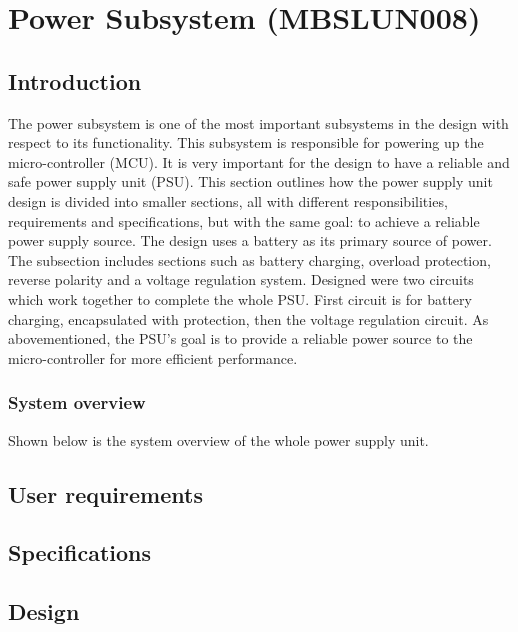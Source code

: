 \documentclass[class=report,11pt,crop=false]{standalone}
\begin{document}
	\chapter{Power Subsystem (MBSLUN008)}
	\vspace{0.5cm}
	\section{Introduction}
	The power subsystem is one of the most important subsystems in the design with respect to its functionality. This subsystem is responsible for powering up the micro-controller (MCU). It is very important for the design to have a reliable and safe power supply unit (PSU). This section outlines how the power supply unit design is divided into smaller sections, all with different responsibilities, requirements and specifications, but with the same goal: to achieve a reliable power supply source. The design uses a battery as its primary source of power. The subsection includes sections such as battery charging, overload protection, reverse polarity and a voltage regulation system. Designed were two circuits which work together to complete the whole PSU. First circuit is for battery charging, encapsulated with protection, then the voltage regulation circuit. As abovementioned, the PSU's goal is to provide a reliable power source to the micro-controller for more efficient performance. 

	\subsection{System overview}
	
	Shown below is the system overview of the whole power supply unit. 
	
	\section{User requirements}
	\section{Specifications}
	
	\section{Design}
\end{document}
